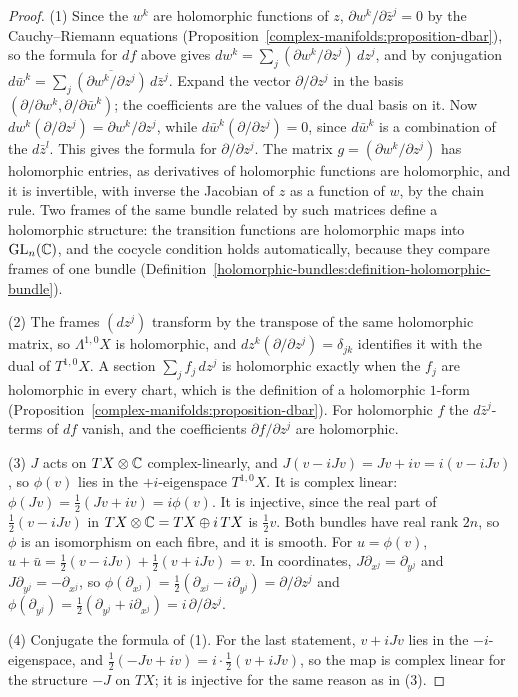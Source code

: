 \begin{proof}
(1) Since the $w^k$ are holomorphic functions of $z$, $\partial w^k/\partial\bar z^j = 0$ by the Cauchy--Riemann equations (Proposition~\ref{complex-manifolds:proposition-dbar}), so the formula for $df$ above gives
$dw^k = \sum_j(\partial w^k/\partial z^j)\,dz^j$, and by conjugation $d\bar w^k = \sum_j\overline{(\partial w^k/\partial z^j)}\,d\bar z^j$. Expand the vector $\partial/\partial z^j$ in the basis
$(\partial/\partial w^k, \partial/\partial\bar w^k)$; the coefficients are the values of the dual basis on it. Now $dw^k(\partial/\partial z^j) = \partial w^k/\partial z^j$, while $d\bar w^k(\partial/\partial z^j) = 0$, since
$d\bar w^k$ is a combination of the $d\bar z^l$. This gives the formula for $\partial/\partial z^j$. The matrix $g = (\partial w^k/\partial z^j)$ has holomorphic entries, as derivatives of holomorphic functions are
holomorphic, and it is invertible, with inverse the Jacobian of $z$ as a function of $w$, by the chain rule. Two frames of the same bundle related by such matrices define a holomorphic structure: the transition
functions are holomorphic maps into $\mathrm{GL}_n(\mathbb{C})$, and the cocycle condition holds automatically, because they compare frames of one bundle (Definition~\ref{holomorphic-bundles:definition-holomorphic-bundle}).

(2) The frames $(dz^j)$ transform by the transpose of the same holomorphic matrix, so $\Lambda^{1,0}X$ is holomorphic, and $dz^k(\partial/\partial z^j) = \delta_{jk}$ identifies it with the dual of $T^{1,0}X$. A
section $\sum_jf_j\,dz^j$ is holomorphic exactly when the $f_j$ are holomorphic in every chart, which is the definition of a holomorphic $1$-form (Proposition~\ref{complex-manifolds:proposition-dbar}). For holomorphic
$f$ the $d\bar z^j$-terms of $df$ vanish, and the coefficients $\partial f/\partial z^j$ are holomorphic.

(3) $J$ acts on $TX \otimes \mathbb{C}$ complex-linearly, and $J(v - iJv) = Jv + iv = i(v - iJv)$, so $\phi(v)$ lies in the $+i$-eigenspace $T^{1,0}X$. It is complex linear: $\phi(Jv) = \frac12(Jv + iv) = i\phi(v)$.
It is injective, since the real part of $\frac12(v - iJv)$ in $TX \otimes \mathbb{C} = TX \oplus i\,TX$ is $\frac12v$. Both bundles have real rank $2n$, so $\phi$ is an isomorphism on each fibre, and it is smooth. For
$u = \phi(v)$, $u + \bar u = \frac12(v - iJv) + \frac12(v + iJv) = v$. In coordinates, $J\partial_{x^j} = \partial_{y^j}$ and $J\partial_{y^j} = -\partial_{x^j}$, so
$\phi(\partial_{x^j}) = \frac12(\partial_{x^j} - i\partial_{y^j}) = \partial/\partial z^j$ and $\phi(\partial_{y^j}) = \frac12(\partial_{y^j} + i\partial_{x^j}) = i\,\partial/\partial z^j$.

(4) Conjugate the formula of (1). For the last statement, $v + iJv$ lies in the $-i$-eigenspace, and $\frac12(-Jv + iv) = i \cdot \frac12(v + iJv)$, so the map is complex linear for the structure $-J$ on $TX$; it is
injective for the same reason as in (3).
\end{proof}

